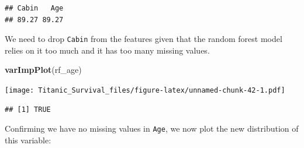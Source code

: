 \documentclass[]{article}
\newenvironment{Shaded}{\begin{snugshade}}{\end{snugshade}}
\newcommand{\KeywordTok}[1]{\textcolor[rgb]{0.13,0.29,0.53}{\textbf{#1}}}
\newcommand{\DataTypeTok}[1]{\textcolor[rgb]{0.13,0.29,0.53}{#1}}
\newcommand{\DecValTok}[1]{\textcolor[rgb]{0.00,0.00,0.81}{#1}}
\newcommand{\StringTok}[1]{\textcolor[rgb]{0.31,0.60,0.02}{#1}}
\newcommand{\CommentTok}[1]{\textcolor[rgb]{0.56,0.35,0.01}{\textit{#1}}}
\newcommand{\OperatorTok}[1]{\textcolor[rgb]{0.81,0.36,0.00}{\textbf{#1}}}
\newcommand{\NormalTok}[1]{#1}
\begin{document}
\begin{verbatim}
## Cabin   Age 
## 89.27 89.27
\end{verbatim}

We need to drop \texttt{Cabin} from the features given that the random
forest model relies on it too much and it has too many missing values.

\begin{Shaded}
\begin{Highlighting}[]
\KeywordTok{varImpPlot}\NormalTok{(rf_age)}
\end{Highlighting}
\end{Shaded}

\texttt{[image: Titanic\_Survival\_files/figure-latex/unnamed-chunk-42-1.pdf]}

\begin{Shaded}
\end{Shaded}

\begin{verbatim}
## [1] TRUE
\end{verbatim}

Confirming we have no missing values in \texttt{Age}, we now plot the
new distribution of this variable:
\end{document}
